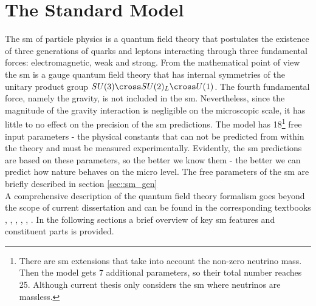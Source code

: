 \chapter{The Standard Model}
    
	The \gls{sm} of particle physics is a quantum field theory that postulates the existence of three generations of quarks and leptons interacting through three fundamental forces: electromagnetic, weak and strong. From the mathematical point of view the \gls{sm} is a gauge quantum field theory that has internal symmetries of the unitary product group $SU(3)\cross SU(2)_L \cross U(1)$.  The fourth fundamental force, namely the gravity, is not included in the \gls{sm}. Nevertheless, since the magnitude of the gravity interaction is negligible on the microscopic scale, it has little to no effect on the precision of the \gls{sm} predictions. The model has 18\footnote{There are \gls{sm} extensions that take into account the non-zero neutrino mass. Then the model gets 7 additional parameters, so their total number reaches 25. Although current thesis only considers the \gls{sm} where neutrinos are massless.} free input parameters - the physical constants that can not be predicted from within the theory and must be measured experimentally. Evidently, the \gls{sm} predictions are based on these parameters, so the better we know them - the better we can predict how nature behaves on the micro level. The free parameters of the \gls{sm} are briefly described in section \ref{sec::sm_gen}\\

	A comprehensive description of the quantum field theory formalism goes beyond the scope of current dissertation and can be found in the corresponding textbooks \cite{Peskin}, \cite{bogol}, \cite{Srednicki}, \cite{Berest}, \cite{weinberg}, \cite{Griffiths}. In the following sections a brief overview of key \gls{sm} features and constituent parts is provided. \\        

